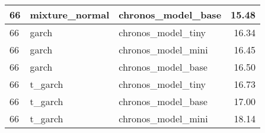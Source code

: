 {\begin{tabular}{lllr}
\midrule
66 & mixture\_normal & chronos\_model\_base & 15.48 \\
\midrule
66 & garch & chronos\_model\_tiny & 16.34 \\
\midrule
66 & garch & chronos\_model\_mini & 16.45 \\
\midrule
66 & garch & chronos\_model\_base & 16.50 \\
\midrule
66 & t\_garch & chronos\_model\_tiny & 16.73 \\
\midrule
66 & t\_garch & chronos\_model\_base & 17.00 \\
\midrule
66 & t\_garch & chronos\_model\_mini & 18.14 \\
\bottomrule
\end{tabular}
}